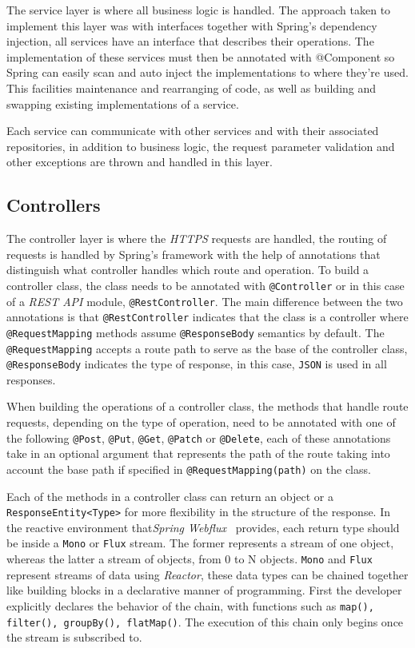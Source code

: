 The service layer is where all business logic is handled. The approach taken to implement this layer was with interfaces together with Spring's dependency injection, all services have an interface that describes their operations. The implementation of these services must then be annotated with @Component so Spring can easily scan and auto inject the implementations to where they're used. This facilities maintenance and rearranging of code, as well as building and swapping existing implementations of a service.

Each service can communicate with other services and with their associated repositories, in addition to business logic, the request parameter validation and other exceptions are thrown and handled in this layer.

\subsection{Controllers}

The controller layer is where the \textit{HTTPS} requests are handled, the routing of requests is handled by Spring's framework with the help of annotations that distinguish what controller handles which route and operation.
To build a controller class, the class needs to be annotated with \texttt{@Controller} or in this case of a \textit{REST API} module, \texttt{@RestController}. The main difference between the two annotations is that \texttt{@RestController} indicates that the class is a controller where \texttt{@RequestMapping} methods assume \texttt{@ResponseBody} semantics by default.
The \texttt{@RequestMapping} accepts a route path to serve as the base of the controller class, \texttt{@ResponseBody} indicates the type of response, in this case, \texttt{JSON} is used in all responses. 

When building the operations of a controller class, the methods that handle route requests, depending on the type of operation, need to be annotated with one of the following \texttt{@Post}, \texttt{@Put}, \texttt{@Get}, \texttt{@Patch} or \texttt{@Delete}, each of these annotations take in an optional argument that represents the path of the route taking into account the base path if specified in \texttt{@RequestMapping(path)} on the class. 

Each of the methods in a controller class can return an object or a \texttt{ResponseEntity<Type>} for more flexibility in the structure of the response. In the reactive environment that\textit{Spring Webflux}~\cite{spring-webflux} provides, each return type should be inside a \texttt{Mono} or \texttt{Flux} stream.
The former represents a stream of one object, whereas the latter a stream of objects, from 0 to N objects. \texttt{Mono} and \texttt{Flux} represent streams of data using \textit{Reactor}, these data types can be chained together like building blocks in a declarative manner of programming. First the developer explicitly declares the behavior of the chain, with functions such as \texttt{map(), filter(), groupBy(), flatMap()}. The execution of this chain only begins once the stream is subscribed to. 

